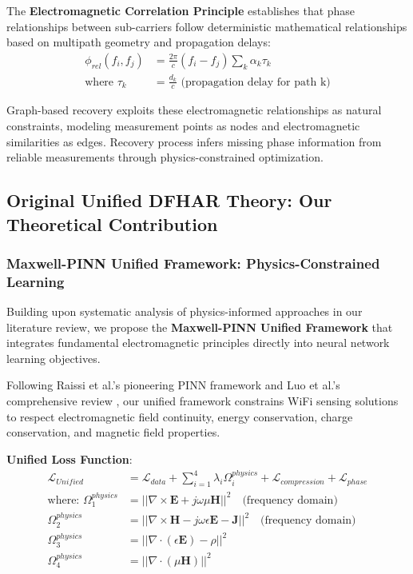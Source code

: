 \documentclass[journal]{IEEEtran}
\begin{document}
The \textbf{Electromagnetic Correlation Principle} establishes that phase relationships between sub-carriers follow deterministic mathematical relationships based on multipath geometry and propagation delays:
\begin{align}
\phi_{rel}(f_i, f_j) &= \frac{2\pi}{c}(f_i - f_j) \sum_{k} \alpha_k \tau_k \\
\text{where } \tau_k &= \frac{d_k}{c} \text{ (propagation delay for path k)}
\end{align}

Graph-based recovery exploits these electromagnetic relationships as natural constraints, modeling measurement points as nodes and electromagnetic similarities as edges. Recovery process infers missing phase information from reliable measurements through physics-constrained optimization.

\subsection{Original Unified DFHAR Theory: Our Theoretical Contribution}

\subsubsection{Maxwell-PINN Unified Framework: Physics-Constrained Learning}

Building upon systematic analysis of physics-informed approaches in our literature review, we propose the \textbf{Maxwell-PINN Unified Framework} that integrates fundamental electromagnetic principles directly into neural network learning objectives.

Following Raissi et al.'s pioneering PINN framework \cite{raissi2019physics} and Luo et al.'s comprehensive review \cite{luo2025physics}, our unified framework constrains WiFi sensing solutions to respect electromagnetic field continuity, energy conservation, charge conservation, and magnetic field properties.

\textbf{Unified Loss Function}:
\begin{align}
\mathcal{L}_{Unified} &= \mathcal{L}_{data} + \sum_{i=1}^{4} \lambda_i \Omega_i^{physics} + \mathcal{L}_{compression} + \mathcal{L}_{phase} \\
\text{where: } \Omega_1^{physics} &= ||\nabla \times \mathbf{E} + j\omega \mu \mathbf{H}||^2 \quad \text{(frequency domain)} \\
\Omega_2^{physics} &= ||\nabla \times \mathbf{H} - j\omega \epsilon \mathbf{E} - \mathbf{J}||^2 \quad \text{(frequency domain)} \\
\Omega_3^{physics} &= ||\nabla \cdot (\epsilon \mathbf{E}) - \rho||^2 \\
\Omega_4^{physics} &= ||\nabla \cdot (\mu \mathbf{H})||^2
\end{align}
\end{document}
